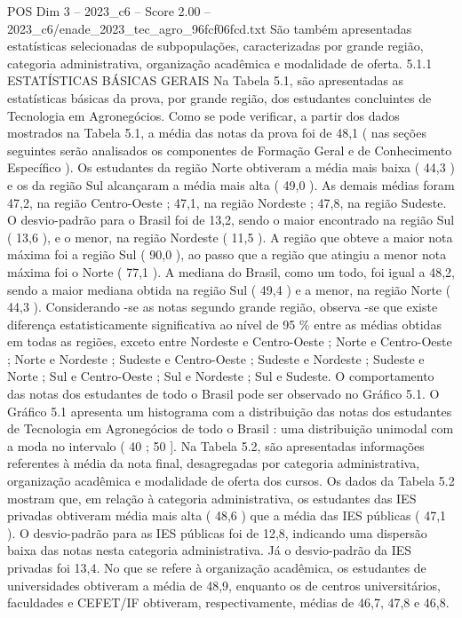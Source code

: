 \begin{textsample}{POS Dim 3 – 2023\_c6 – Score 2.00 – 2023\_c6/enade\_2023\_tec\_agro\_96fcf06fcd.txt}
São também apresentadas estatísticas selecionadas de subpopulações, caracterizadas por grande região, categoria administrativa, organização acadêmica e modalidade de oferta. 5.1.1 ESTATÍSTICAS BÁSICAS GERAIS Na Tabela 5.1, são apresentadas as estatísticas básicas da prova, por grande região, dos estudantes concluintes de Tecnologia em Agronegócios.
Como se pode verificar, a partir dos dados mostrados na Tabela 5.1, a média das notas da prova foi de 48,1 ( nas seções seguintes serão analisados os componentes de Formação Geral e de Conhecimento Específico ).
Os estudantes da região Norte obtiveram a média mais baixa ( 44,3 ) e os da região Sul alcançaram a média mais alta ( 49,0 ).
As demais médias foram 47,2, na região Centro-Oeste ; 47,1, na região Nordeste ; 47,8, na região Sudeste.
O desvio-padrão para o Brasil foi de 13,2, sendo o maior encontrado na região Sul ( 13,6 ), e o menor, na região Nordeste ( 11,5 ).
A região que obteve a maior nota máxima foi a região Sul ( 90,0 ), ao passo que a região que atingiu a menor nota máxima foi o Norte ( 77,1 ).
A mediana do Brasil, como um todo, foi igual a 48,2, sendo a maior mediana obtida na região Sul ( 49,4 ) e a menor, na região Norte ( 44,3 ).
Considerando -se as notas segundo grande região, observa -se que existe diferença estatisticamente significativa ao nível de 95 \% entre as médias obtidas em todas as regiões, exceto entre Nordeste e Centro-Oeste ; Norte e Centro-Oeste ; Norte e Nordeste ; Sudeste e Centro-Oeste ; Sudeste e Nordeste ; Sudeste e Norte ; Sul e Centro-Oeste ; Sul e Nordeste ; Sul e Sudeste.
O comportamento das notas dos estudantes de todo o Brasil pode ser observado no Gráfico 5.1.
O Gráfico 5.1 apresenta um histograma com a distribuição das notas dos estudantes de Tecnologia em Agronegócios de todo o Brasil : uma distribuição unimodal com a moda no intervalo ( 40 ; 50 ].
Na Tabela 5.2, são apresentadas informações referentes à média da nota final, desagregadas por categoria administrativa, organização acadêmica e modalidade de oferta dos cursos.
Os dados da Tabela 5.2 mostram que, em relação à categoria administrativa, os estudantes das IES privadas obtiveram média mais alta ( 48,6 ) que a média das IES públicas ( 47,1 ).
O desvio-padrão para as IES públicas foi de 12,8, indicando uma dispersão baixa das notas nesta categoria administrativa.
Já o desvio-padrão da IES privadas foi 13,4.
No que se refere à organização acadêmica, os estudantes de universidades obtiveram a média de 48,9, enquanto os de centros universitários, faculdades e CEFET/IF obtiveram, respectivamente, médias de 46,7, 47,8 e 46,8.

\end{textsample}
